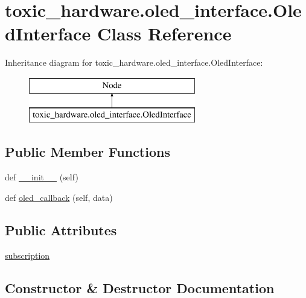 \hypertarget{classtoxic__hardware_1_1oled__interface_1_1OledInterface}{}\section{toxic\+\_\+hardware.\+oled\+\_\+interface.\+Oled\+Interface Class Reference}
\label{classtoxic__hardware_1_1oled__interface_1_1OledInterface}
Inheritance diagram for toxic\+\_\+hardware.\+oled\+\_\+interface.\+Oled\+Interface\+:\begin{figure}[H]
\begin{center}
\leavevmode
\includegraphics[height=2.000000cm]{d9/d4e/classtoxic__hardware_1_1oled__interface_1_1OledInterface}
\end{center}
\end{figure}
\subsection*{Public Member Functions}
\begin{DoxyCompactItemize}
\item 
def \mbox{\hyperlink{classtoxic__hardware_1_1oled__interface_1_1OledInterface_adf1e7b9ead9d51114144139109525e89}{\+\_\+\+\_\+init\+\_\+\+\_\+}} (self)
\item 
def \mbox{\hyperlink{classtoxic__hardware_1_1oled__interface_1_1OledInterface_a00f03e2e6c9be3351c8cc269c2fcc405}{oled\+\_\+callback}} (self, data)
\end{DoxyCompactItemize}
\subsection*{Public Attributes}
\begin{DoxyCompactItemize}
\item 
\mbox{\hyperlink{classtoxic__hardware_1_1oled__interface_1_1OledInterface_a3e1c9b1144c59f9298cc0f5ca1e2151d}{subscription}}
\end{DoxyCompactItemize}


\subsection{Constructor \& Destructor Documentation}
\mbox{\label{classtoxic__hardware_1_1oled__interface_1_1OledInterface_adf1e7b9ead9d51114144139109525e89}} 
